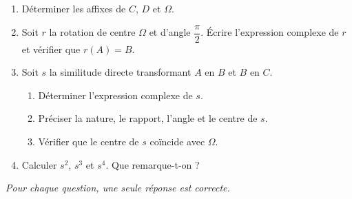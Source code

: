 \begin{enumerate}
	\item Déterminer les affixes de $C$, $D$ et $\Omega$.

	\item Soit $r$ la rotation de centre $\Omega$ et d'angle $\dfrac{\pi}{2}$.
	Écrire l'expression complexe de $r$ et vérifier que $r(A) = B$.

	\item Soit $s$ la similitude directe transformant $A$ en $B$ et $B$ en $C$.
	\begin{enumerate}
		\item Déterminer l'expression complexe de $s$.
		\item Préciser la nature, le rapport, l'angle et le centre de $s$.
		\item Vérifier que le centre de $s$ coïncide avec $\Omega$.
	\end{enumerate}

	\item Calculer $s^2$, $s^3$ et $s^4$. Que remarque-t-on ?
\end{enumerate}




\textit{Pour chaque question, une seule réponse est correcte.}

